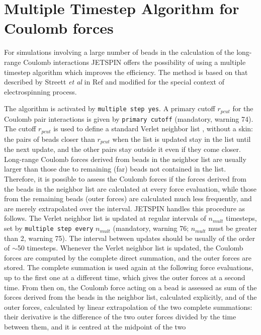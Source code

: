 \section{Multiple Timestep Algorithm for Coulomb forces\label{sec:Multiple-Timestep-Algorithm}}

For simulations involving a large number of beads in the calculation
of the long-range Coulomb interactions JETSPIN offers the possibility
of using a multiple timestep algorithm which improves the efficiency.
The method is based on that described by Streett \textit{et al} in
Ref \cite{streett1978multiple} and modified for the special context
of electrospinning process.

The algorithm is activated by \texttt{multiple step yes}. A primary
cutoff $r_{pcut}$ for the Coulomb pair interactions is given by
\texttt{primary cutoff} (mandatory, warning 74). The cutoff $r_{pcut}$
is used to define a standard Verlet neighbor list \cite{allen1989computer},
without a skin: the pairs of beads closer than $r_{pcut}$ when the list
is updated stay in the list until the next update, and the other pairs
stay outside it even if they come closer. Long-range Coulomb forces
derived from beads in the neighbor list
are usually larger than those due to remaining (far) beads not contained
in the list. Therefore, it is possible to assess the Coulomb forces
if the forces derived from the beads in the neighbor list are calculated
at every force evaluation, while those from the remaining beads (outer
forces) are calculated much less frequently, and are merely extrapolated
over the interval. JETSPIN handles this procedure as follows. The Verlet
neighbor list is updated at regular intervals of $n_{mult}$ timesteps,
set by \texttt{multiple step every} $n_{mult}$ (mandatory, warning 76;
$n_{mult}$ must be greater than 2, warning 75). The interval between
updates should be usually of the order of \ensuremath{\sim}50 timesteps.
Whenever the Verlet neighbor list is updated, the Coulomb forces are
computed by the complete direct summation, and the outer forces are
stored. The complete summation is used again at the following force
evaluations, up to the first one at a different time, which gives the
outer forces at a second time. From then on, the Coulomb force acting
on a bead is assessed as sum of the forces derived from the beads in
the neighbor list, calculated explicitly, and of the outer forces,
calculated by linear extrapolation of the two complete summations:
their derivative is the difference of the two outer forces divided
by the time between them, and it is centred at the midpoint of the two

